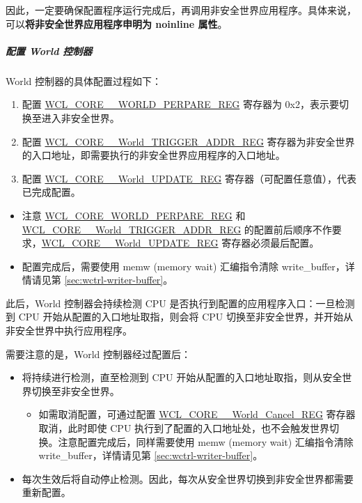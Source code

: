 \documentclass[main\_\_CN.tex]{subfiles}
\begin{document}
因此，一定要确保配置程序运行完成后，再调用非安全世界应用程序。具体来说，可以\textbf{将非安全世界应用程序申明为 noinline 属性}。


\subparagraph{配置 World 控制器}

World 控制器的具体配置过程如下：
\begin{enumerate}
    \item 配置 \hyperref[regdesc:WCLCORE0WORLDPREPAREREG]{WCL\_CORE\_\_WORLD\_PERPARE\_REG} 寄存器为 0x{}2，表示要切换至进入非安全世界。
    \item 配置 \hyperref[regdesc:WCLCORE0WORLDTRIGGERADDRREG]{WCL\_CORE\_\_World\_TRIGGER\_ADDR\_REG} 寄存器为非安全世界的入口地址，即需要执行的非安全世界应用程序的入口地址。
    \item 配置 \hyperref[regdesc:WCLCORE0WORLDUPDATEREG]{WCL\_CORE\_\_World\_UPDATE\_REG} 寄存器（可配置任意值），代表已完成配置。
\end{enumerate}

\begin{tiplisting}\label{note:38-WCTRL-safe2unsafe}
\vspace{-2em}
\begin{itemize}
    \item 注意 \hyperref[regdesc:WCLCORE0WORLDPREPAREREG]{WCL\_CORE\_WORLD\_PERPARE\_REG} 和 \hyperref[regdesc:WCLCORE0WORLDTRIGGERADDRREG]{WCL\_CORE\_\_World\_TRIGGER\_ADDR\_REG} 的配置前后顺序不作要求，\hyperref[regdesc:WCLCORE0WORLDUPDATEREG]{WCL\_CORE\_\_World\_UPDATE\_REG} 寄存器必须最后配置。
    \item 配置完成后，需要使用 memw (memory wait) 汇编指令清除 write\_buffer，详情请见第 \ref{sec:wctrl-writer-buffer}。
\end{itemize}
\end{tiplisting}

此后，World 控制器会持续检测 CPU 是否执行到配置的应用程序入口：一旦检测到 CPU 开始从配置的入口地址取指，则会将 CPU 切换至非安全世界，并开始从非安全世界中执行应用程序。

需要注意的是，World 控制器经过配置后：
\begin{itemize}
    \item 将持续进行检测，直至检测到 CPU 开始从配置的入口地址取指，则从安全世界切换至非安全世界。
    \begin{itemize}
        \item 如需取消配置，可通过配置 \hyperref[regdesc:WCLCORE0WORLDCANCELREG]{WCL\_CORE\_\_World\_Cancel\_REG} 寄存器取消，此时即使 CPU 执行到了配置的入口地址处，也不会触发世界切换。注意配置完成后，同样需要使用 memw (memory wait) 汇编指令清除 write\_buffer，详情请见第 \ref{sec:wctrl-writer-buffer}。
    \end{itemize}
    \item 每次生效后将自动停止检测。因此，每次从安全世界切换到非安全世界都需要重新配置。
\end{itemize}
\end{document}
